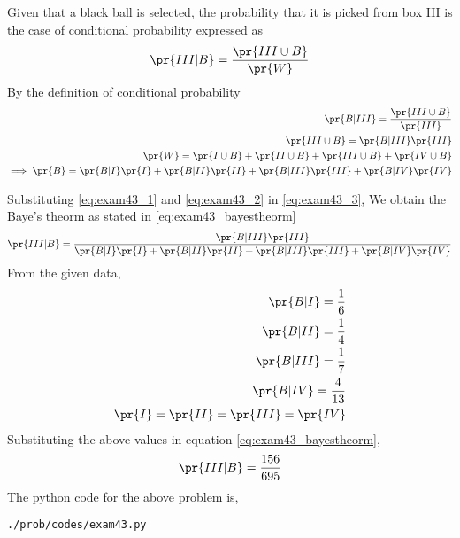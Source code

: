Given that a black ball is selected, the probability that it is picked from box III is the case of conditional probability expressed as
\begin{align}
\pr{III|B}=\frac{\pr{III \cup B}}{\pr{W}}
\label{eq:exam43_3}
\end{align}
By the definition of conditional probability
\begin{align}
\pr{B|III}=\frac{\pr{III \cup B}}{\pr{III}}
\\
\pr{III \cup B} = \pr{B|III}\pr{III}
\label{eq:exam43_1}
\\
\pr{W}=\pr{I \cup B}+\pr{II \cup B}+\pr{III \cup B}+\pr{IV \cup B}
\\
\implies \pr{B} = \pr{B|I} \pr{I}+\pr{B|II} \pr{II}+\pr{B|III} \pr{III}+\pr{B|IV} \pr{IV}
\label{eq:exam43_2}
\end{align}

Substituting \eqref{eq:exam43_1} and \eqref{eq:exam43_2} in \eqref{eq:exam43_3}, We obtain the Baye's theorm as stated in \eqref{eq:exam43_bayestheorm}
\begin{align}
\pr{III|B}= \frac{\pr{B|III} \pr{III}}{\pr{B|I} \pr{I}+\pr{B|II} \pr{II}+\pr{B|III} \pr{III}+\pr{B|IV} \pr{IV}}
\label{eq:exam43_bayestheorm}
\end{align}
From the given data,
\begin{align}
\pr{B|I} = \frac{1}{6}
\\
\pr{B|II} = \frac{1}{4}
\\
\pr{B|III} = \frac{1}{7}
\\
\pr{B|IV} = \frac{4}{13}
\\
\pr{I}=\pr{II}=\pr{III}=\pr{IV}
\end{align}
Substituting the above values in equation \eqref{eq:exam43_bayestheorm},
\begin{align}
\pr{III|B}=\frac{156}{695}
\end{align}
The python code for the above problem is,
\begin{lstlisting}
./prob/codes/exam43.py
\end{lstlisting}
